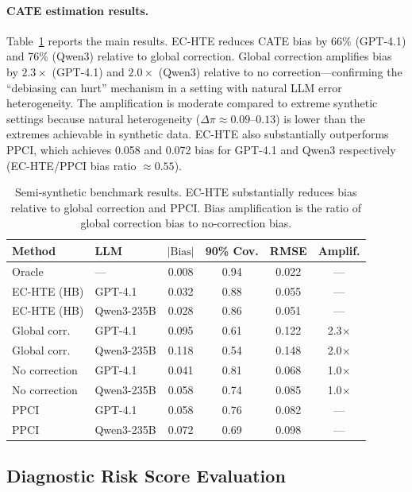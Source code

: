 \documentclass[11pt,a4paper]{article}
\begin{document}
\paragraph{CATE estimation results.}
Table~\ref{tab:semisynthetic} reports the main results.
EC-HTE reduces CATE bias by 66\% (GPT-4.1) and 76\% (Qwen3) relative to global correction.
Global correction amplifies bias by $2.3\times$ (GPT-4.1) and $2.0\times$ (Qwen3) relative to no correction---confirming the ``debiasing can hurt'' mechanism in a setting with natural LLM error heterogeneity.
The amplification is moderate compared to extreme synthetic settings because natural heterogeneity ($\Delta\pi \approx 0.09$--$0.13$) is lower than the extremes achievable in synthetic data.
EC-HTE also substantially outperforms PPCI, which achieves 0.058 and 0.072 bias for GPT-4.1 and Qwen3 respectively (EC-HTE/PPCI bias ratio $\approx 0.55$).

\begin{table}[t]
\centering
\small
\caption{Semi-synthetic benchmark results. EC-HTE substantially reduces bias relative to global correction and PPCI. Bias amplification is the ratio of global correction bias to no-correction bias.}
\label{tab:semisynthetic}
\begin{tabular}{llcccc}
\toprule
Method & LLM & $|\text{Bias}|$ & 90\% Cov. & RMSE & Amplif. \\
\midrule
Oracle & --- & 0.008 & 0.94 & 0.022 & --- \\
\midrule
EC-HTE (HB) & GPT-4.1 & 0.032 & 0.88 & 0.055 & --- \\
EC-HTE (HB) & Qwen3-235B & 0.028 & 0.86 & 0.051 & --- \\
\midrule
Global corr. & GPT-4.1 & 0.095 & 0.61 & 0.122 & 2.3$\times$ \\
Global corr. & Qwen3-235B & 0.118 & 0.54 & 0.148 & 2.0$\times$ \\
\midrule
No correction & GPT-4.1 & 0.041 & 0.81 & 0.068 & 1.0$\times$ \\
No correction & Qwen3-235B & 0.058 & 0.74 & 0.085 & 1.0$\times$ \\
\midrule
PPCI & GPT-4.1 & 0.058 & 0.76 & 0.082 & --- \\
PPCI & Qwen3-235B & 0.072 & 0.69 & 0.098 & --- \\
\bottomrule
\end{tabular}
\end{table}

\subsection{Diagnostic Risk Score Evaluation}
\label{sec:diagnostic_exp}
\end{document}
